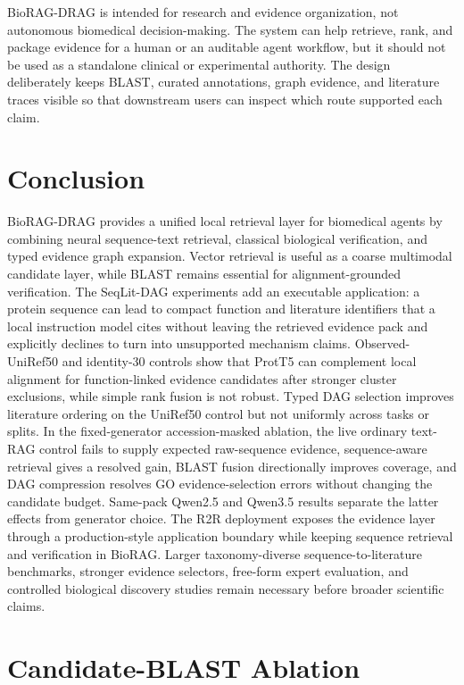 \documentclass[11pt]{article}
\begin{document}
BioRAG-DRAG is intended for research and evidence organization, not autonomous biomedical decision-making. The system can help retrieve, rank, and package evidence for a human or an auditable agent workflow, but it should not be used as a standalone clinical or experimental authority. The design deliberately keeps BLAST, curated annotations, graph evidence, and literature traces visible so that downstream users can inspect which route supported each claim.

\section{Conclusion}

BioRAG-DRAG provides a unified local retrieval layer for biomedical agents by combining neural sequence-text retrieval, classical biological verification, and typed evidence graph expansion. Vector retrieval is useful as a coarse multimodal candidate layer, while BLAST remains essential for alignment-grounded verification. The SeqLit-DAG experiments add an executable application: a protein sequence can lead to compact function and literature identifiers that a local instruction model cites without leaving the retrieved evidence pack and explicitly declines to turn into unsupported mechanism claims. Observed-UniRef50 and identity-30 controls show that ProtT5 can complement local alignment for function-linked evidence candidates after stronger cluster exclusions, while simple rank fusion is not robust. Typed DAG selection improves literature ordering on the UniRef50 control but not uniformly across tasks or splits. In the fixed-generator accession-masked ablation, the live ordinary text-RAG control fails to supply expected raw-sequence evidence, sequence-aware retrieval gives a resolved gain, BLAST fusion directionally improves coverage, and DAG compression resolves GO evidence-selection errors without changing the candidate budget. Same-pack Qwen2.5 and Qwen3.5 results separate the latter effects from generator choice. The R2R deployment exposes the evidence layer through a production-style application boundary while keeping sequence retrieval and verification in BioRAG. Larger taxonomy-diverse sequence-to-literature benchmarks, stronger evidence selectors, free-form expert evaluation, and controlled biological discovery studies remain necessary before broader scientific claims.

\appendix
\section{Candidate-BLAST Ablation}
\label{app:candidate-blast}
\end{document}
